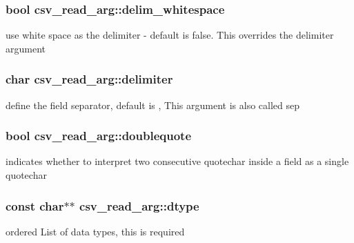 \subsubsection[{\texorpdfstring{delim\+\_\+whitespace}{delim_whitespace}}]{\setlength{\rightskip}{0pt plus 5cm}bool csv\+\_\+read\+\_\+arg\+::delim\+\_\+whitespace}\hypertarget{structcsv__read__arg_a4b7dc9783c0216f800f8fc8a4443bd17}{}\label{structcsv__read__arg_a4b7dc9783c0216f800f8fc8a4443bd17}
use white space as the delimiter -\/ default is false. This overrides the delimiter argument 
\subsubsection[{\texorpdfstring{delimiter}{delimiter}}]{\setlength{\rightskip}{0pt plus 5cm}char csv\+\_\+read\+\_\+arg\+::delimiter}\hypertarget{structcsv__read__arg_a0a57c07fa15c344435a9e0c4922a4732}{}\label{structcsv__read__arg_a0a57c07fa15c344435a9e0c4922a4732}
define the field separator, default is \textquotesingle{},\textquotesingle{} This argument is also called \textquotesingle{}sep\textquotesingle{} 
\subsubsection[{\texorpdfstring{doublequote}{doublequote}}]{\setlength{\rightskip}{0pt plus 5cm}bool csv\+\_\+read\+\_\+arg\+::doublequote}\hypertarget{structcsv__read__arg_abc0b185723b901901c3fa38c79314537}{}\label{structcsv__read__arg_abc0b185723b901901c3fa38c79314537}
indicates whether to interpret two consecutive quotechar inside a field as a single quotechar 
\subsubsection[{\texorpdfstring{dtype}{dtype}}]{\setlength{\rightskip}{0pt plus 5cm}const char$\ast$$\ast$ csv\+\_\+read\+\_\+arg\+::dtype}\hypertarget{structcsv__read__arg_abbdd5cb96e423e646e0f648182706d48}{}\label{structcsv__read__arg_abbdd5cb96e423e646e0f648182706d48}
ordered List of data types, this is required 

